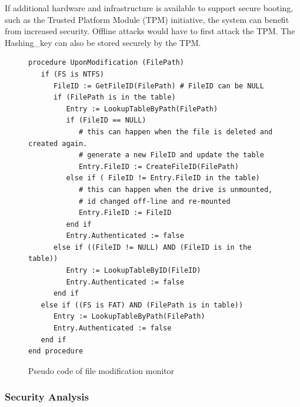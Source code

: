 If additional hardware and infrastructure is available to support
secure booting, such as the Trusted Platform Module (TPM) initiative,
the system can benefit from increased security.
Offline attacks would have to first attack the TPM.
The Hashing\_key can also be stored securely by the TPM.


\begin{figure}[tb]
\scriptsize
\begin{center}
\begin{verbatim}
procedure UponModification (FilePath)
   if (FS is NTFS)
      FileID := GetFileID(FilePath) # FileID can be NULL
      if (FilePath is in the table)
         Entry := LookupTableByPath(FilePath)
         if (FileID == NULL)
            # this can happen when the file is deleted and created again.
            # generate a new FileID and update the table
            Entry.FileID := CreateFileID(FilePath)
         else if ( FileID != Entry.FileID in the table)
            # this can happen when the drive is unmounted,
            # id changed off-line and re-mounted
            Entry.FileID := FileID
         end if
         Entry.Authenticated := false
      else if ((FileID != NULL) AND (FileID is in the table))
         Entry := LookupTableByID(FileID)
         Entry.Authenticated := false
      end if
   else if ((FS is FAT) AND (FilePath is in table))
      Entry := LookupTableByPath(FilePath)
      Entry.Authenticated := false
   end if
end procedure
\end{verbatim}
\end{center}
\caption{Pseudo code of file modification monitor}
\label{fileopen}
\end{figure}
\subsubsection{Security Analysis}
\label{sect:analysis}


